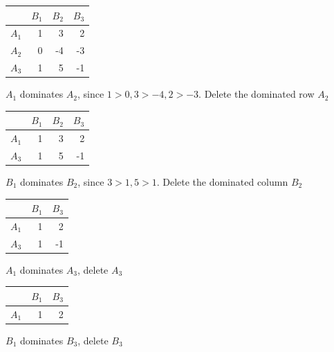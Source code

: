 \documentclass[12pt]{article}
\begin{document}
\begin{center}
\begin{tabular}{|r|rrr|}
\hline
        &  $B_1$  &  $B_2$  &  $B_3$  \\
\hline
 $A_1$  &      1  &      3  &      2  \\
 $A_2$  &      0  &     -4  &     -3  \\
 $A_3$  &      1  &      5  &     -1  \\
\hline
\end{tabular}
\end{center}



$A_1$ dominates $A_2$, since $1>0, 3>-4, 2>-3$. Delete the dominated row $A_2$


\begin{center}
\begin{tabular}{|r|rrr|}
\hline
        &  $B_1$  &  $B_2$  &  $B_3$  \\
\hline
 $A_1$  &      1  &      3  &      2  \\
 $A_3$  &      1  &      5  &     -1  \\
\hline
\end{tabular}
\end{center}



$B_1$ dominates $B_2$, since $3>1, 5>1$. Delete the dominated column $B_2$


\begin{center}
\begin{tabular}{|r|rr|}
\hline
        &  $B_1$  &  $B_3$  \\
\hline
 $A_1$  &      1  &      2  \\
 $A_3$  &      1  &     -1  \\
\hline
\end{tabular}
\end{center}



$A_1$ dominates $A_3$, delete $A_3$


\begin{center}
\begin{tabular}{|r|rr|}
\hline
        &  $B_1$  &  $B_3$  \\
\hline
 $A_1$  &      1  &      2  \\
\hline
\end{tabular}
\end{center}



$B_1$ dominates $B_3$, delete $B_3$
\end{document}
